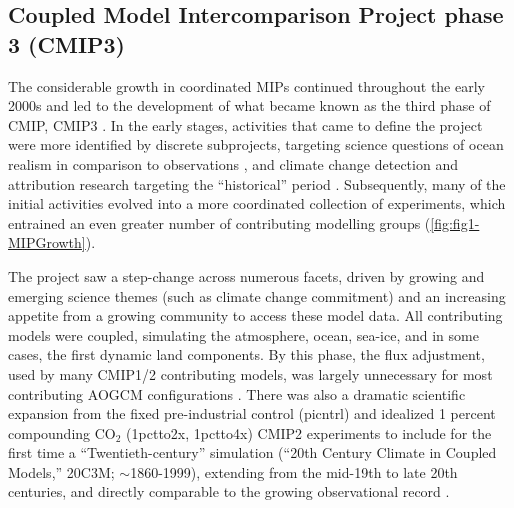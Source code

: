 \documentclass[manuscript]{copernicus}
\newcommand{\mycomment}[1]{}
\begin{document}
\subsection{Coupled Model Intercomparison Project phase 3 (CMIP3)}
\label{sec:cmip3}
\mycomment{
Dave B 241120: the CMIP3 section understates the transformational data availability and distribution change.
Susan Solomon, WGI head, asked WGCM chairs John Mitchell and ?? (maybe J. Meehl) to prepare an archive of standard model experiments for use by the, and this is critical, the WG1 community. As you would have expected, WGCM then asked PCMDI to take the lead. After talking to Dean, I responded “yes” with two requirements – the data needed to be in a standardized format before being sent to PCMDI, and the users were expected to be familiar with the data and its format.
Before CMIP3, output format standardization (Karl and Peter G.) and setting up the ESGF data server to have all CMIP3 data online and in one place (Dean, Bob, and Jenny) were not done in AMIP or CMIP. 
The WGCM’s best guess was that 50 users would access the data, and the data volume would be $\sim$17 TBytes. You know the rest of the story.
}

The considerable growth in coordinated MIPs continued throughout the early 2000s and led to the development of what became known as the third phase of CMIP, CMIP3 \citep{meehl_wcrp_2007}. In the early stages, activities that came to define the project were more identified by discrete subprojects, targeting science questions of ocean realism in comparison to observations \citep[e.g.,][]{orr_ocean_1999, dutay_evaluation_2002,dutay_evaluation_2004}, and climate change detection and attribution research targeting the ``historical'' period \citep[e.g.,][]{hegerl_20c3m_2003}. Subsequently, many of the initial activities evolved into a more coordinated collection of experiments, which entrained an even greater number of contributing modelling groups (\autoref{fig:fig1-MIPGrowth}).

The project saw a step-change across numerous facets, driven by growing and emerging science themes (such as climate change commitment) and an increasing appetite from a growing community to access these model data. All contributing models were coupled, simulating the atmosphere, ocean, sea-ice, and in some cases, the first dynamic land components. By this phase, the flux adjustment, used by many CMIP1/2 contributing models, was largely unnecessary for most contributing AOGCM configurations \citep[e.g.,][]{covey_overview_2003,durack_ocean_2012}. There was also a dramatic scientific expansion from the fixed pre-industrial control (picntrl) and idealized 1 percent compounding CO$_{2}$ (1pctto2x, 1pctto4x) CMIP2 experiments to include for the first time a ``Twentieth-century'' simulation (``20th Century Climate in Coupled Models,'' 20C3M; $\sim$1860-1999), extending from the mid-19th to late 20th centuries, and directly comparable to the growing observational record \citep[][\autoref{tab:tabAppA1-MIPExperiments}]{meehl_wcrp_2007}.
\end{document}
